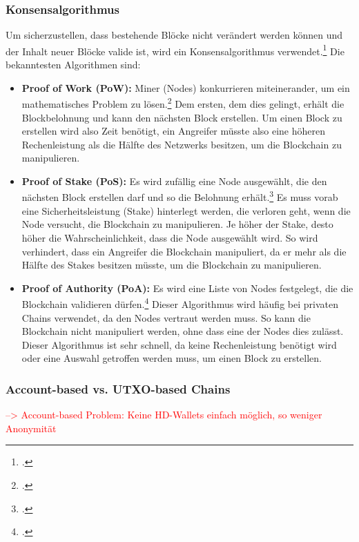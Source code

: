 \subsubsection{Konsensalgorithmus}
\label{sec:definition-konsensalgorithmus}
Um sicherzustellen, dass bestehende Blöcke nicht verändert werden können und der Inhalt neuer Blöcke valide ist, wird ein Konsensalgorithmus verwendet.\footcite[Vgl.][S. 2 f\adddot]{q4}
Die bekanntesten Algorithmen sind:
\begin{itemize}
    \item \textbf{Proof of Work (PoW):}
    Miner (Nodes) konkurrieren miteinerander, um ein mathematisches Problem zu lösen.\footcite[Vgl. hierzu und im Folgenden][3]{q4}
    Dem ersten, dem dies gelingt, erhält die Blockbelohnung und kann den nächsten Block erstellen.
    Um einen Block zu erstellen wird also Zeit benötigt, ein Angreifer müsste also eine höheren Rechenleistung als die Hälfte des Netzwerks besitzen, um die Blockchain zu manipulieren.

    \item \textbf{Proof of Stake (PoS):}
    Es wird zufällig eine Node ausgewählt, die den nächsten Block erstellen darf und so die Belohnung erhält.\footcite[Vgl. hierzu und im Folgenden][2]{q7}
    Es muss vorab eine Sicherheitsleistung (Stake) hinterlegt werden, die verloren geht, wenn die Node versucht, die Blockchain zu manipulieren. 
    Je höher der Stake, desto höher die Wahrscheinlichkeit, dass die Node ausgewählt wird.
    So wird verhindert, dass ein Angreifer die Blockchain manipuliert, da er mehr als die Hälfte des Stakes besitzen müsste, um die Blockchain zu manipulieren.

    \item \textbf{Proof of Authority (PoA):}
    Es wird eine Liste von Nodes festgelegt, die die Blockchain validieren dürfen.\footcite[Vgl. hierzu und im Folgenden][]{w14}
    Dieser Algorithmus wird häufig bei privaten Chains verwendet, da den Nodes vertraut werden muss.
    So kann die Blockchain nicht manipuliert werden, ohne dass eine der Nodes dies zulässt.
    Dieser Algorithmus ist sehr schnell, da keine Rechenleistung benötigt wird oder eine Auswahl getroffen werden muss, um einen Block zu erstellen.
    
\end{itemize}

\subsubsection{Account-based vs. UTXO-based Chains}
\label{sec:definition-account-based-vs-utxo-based-chains}
\textcolor{red}{--> Account-based Problem: Keine HD-Wallets einfach möglich, so weniger Anonymität}

